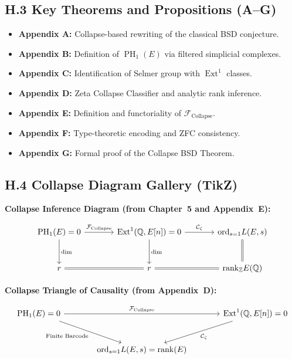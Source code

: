 \documentclass[11pt]{article}
\DeclareMathOperator{\Ext}{Ext}
\DeclareMathOperator{\PH}{PH}
\newcommand{\QQ}{\mathbb{Q}}
\newcommand{\ZZ}{\mathbb{Z}}
\begin{document}
\subsection*{H.3 Key Theorems and Propositions (A–G)}

\begin{itemize}
  \item \textbf{Appendix A:} Collapse-based rewriting of the classical BSD conjecture.
  \item \textbf{Appendix B:} Definition of $\PH_1(E)$ via filtered simplicial complexes.
  \item \textbf{Appendix C:} Identification of Selmer group with $\Ext^1$ classes.
  \item \textbf{Appendix D:} Zeta Collapse Classifier and analytic rank inference.
  \item \textbf{Appendix E:} Definition and functoriality of $\mathcal{F}_{\mathrm{Collapse}}$.
  \item \textbf{Appendix F:} Type-theoretic encoding and ZFC consistency.
  \item \textbf{Appendix G:} Formal proof of the Collapse BSD Theorem.
\end{itemize}

\subsection*{H.4 Collapse Diagram Gallery (TikZ)}

\vspace{0.5em}
\noindent \textbf{Collapse Inference Diagram (from Chapter~5 and Appendix~E):}

\[
\begin{tikzcd}[row sep=large, column sep=large]
\PH_1(E) = 0 \arrow[r, "\mathcal{F}_{\mathrm{Collapse}}"] \arrow[d, "\dim"]
& \Ext^1(\QQ,E[n]) = 0 \arrow[d, "\dim"] \arrow[r, "\mathcal{C}_\zeta"]
& \mathrm{ord}_{s=1} L(E,s) \arrow[d, equal] \\
r \arrow[r, equal] & r \arrow[r, equal] & \mathrm{rank}_{\ZZ} E(\QQ)
\end{tikzcd}
\]

\vspace{1em}
\noindent \textbf{Collapse Triangle of Causality (from Appendix~D):}

\[
\begin{tikzcd}[row sep=large, column sep=large]
\PH_1(E) = 0 \arrow[rr, "\mathcal{F}_{\mathrm{Collapse}}"] \arrow[dr, swap, "\text{Finite Barcode}"]
& & \Ext^1(\QQ,E[n]) = 0 \arrow[dl, "\mathcal{C}_\zeta"] \\
& \mathrm{ord}_{s=1} L(E,s) = \mathrm{rank}(E) &
\end{tikzcd}
\]
\end{document}
